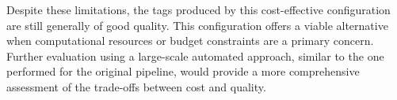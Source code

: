 Despite these limitations, the tags produced by this cost-effective configuration are still generally of good quality. This configuration offers a viable alternative when computational resources or budget constraints are a primary concern. Further evaluation using a large-scale automated approach, similar to the one performed for the original pipeline, would provide a more comprehensive assessment of the trade-offs between cost and quality.






